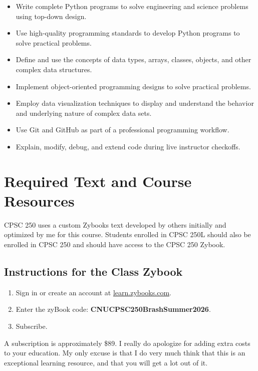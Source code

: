 \documentclass[11pt]{article}
\begin{document}
\begin{itemize}[itemsep=0.2em]
    \item Write complete Python programs to solve engineering and science problems using top-down design.
    \item Use high-quality programming standards to develop Python programs to solve practical problems.
    \item Define and use the concepts of data types, arrays, classes, objects, and other complex data structures.
    \item Implement object-oriented programming designs to solve practical problems.
    \item Employ data visualization techniques to display and understand the behavior and underlying nature of complex data sets.
    \item Use Git and GitHub as part of a professional programming workflow.
    \item Explain, modify, debug, and extend code during live instructor checkoffs.
\end{itemize}

\section{Required Text and Course Resources}

CPSC 250 uses a custom Zybooks text developed by others initially and optimized by me for this course. Students enrolled in CPSC 250L should also be enrolled in CPSC 250 and should have access to the CPSC 250 Zybook.

\subsection{Instructions for the Class Zybook}

\begin{enumerate}[itemsep=0.2em]
    \item Sign in or create an account at \href{https://learn.zybooks.com}{learn.zybooks.com}.
    \item Enter the zyBook code: \textbf{CNUCPSC250BrashSummer2026}.
    \item Subscribe.
\end{enumerate}

A subscription is approximately \$89. I really do apologize for adding extra costs to your education. My only excuse is that I do very much think that this is an exceptional learning resource, and that you will get a lot out of it.
\end{document}
